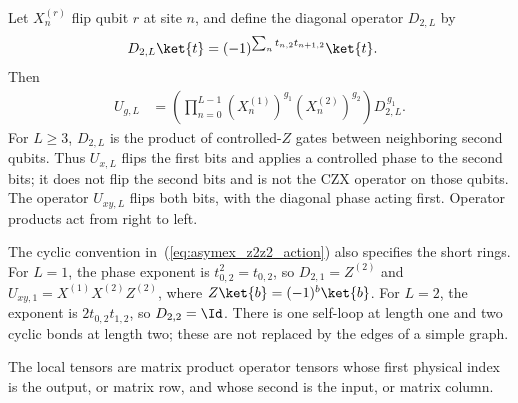 Let $X_n^{(r)}$ flip qubit $r$ at site $n$, and define the diagonal
operator $D_{2,L}$ by
\begin{align}
    D_{2,L}\ket{t} & =(-1)^{\sum_n t_{n,2}t_{n+1,2}}\ket{t}.
    \notag
\end{align}
Then
\begin{align}
    U_{g,L}
     & =\left(\prod_{n=0}^{L-1}
    (X_n^{(1)})^{g_1}(X_n^{(2)})^{g_2}\right)D_{2,L}^{\,g_1}.
    \label{eq:asymex_z2z2_gates}
\end{align}
For $L\geq3$, $D_{2,L}$ is the product of controlled-$Z$ gates
between neighboring second qubits.
Thus $U_{x,L}$ flips the first bits and applies a controlled phase
to the second bits; it does not flip the second bits and is not
the CZX operator on those qubits.
The operator $U_{xy,L}$ flips both bits, with the diagonal phase
acting first. Operator products act from right to left.

The cyclic convention in~(\ref{eq:asymex_z2z2_action}) also specifies
the short rings. For $L=1$, the phase exponent is
$t_{0,2}^2=t_{0,2}$, so $D_{2,1}=Z^{(2)}$ and
$U_{xy,1}=X^{(1)}X^{(2)}Z^{(2)}$, where
$Z\ket{b}=(-1)^b\ket{b}$.
For $L=2$, the exponent is $2t_{0,2}t_{1,2}$, so $D_{2,2}=\Id$.
There is one self-loop at length one and two cyclic bonds at length
two; these are not replaced by the edges of a simple graph.

The local tensors are matrix product operator tensors whose first
physical index is the output, or matrix row, and whose second is the
input, or matrix column.


